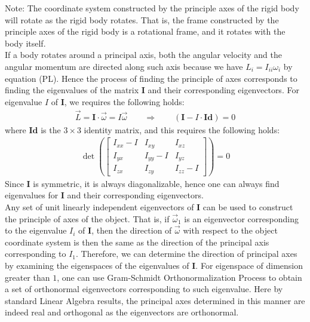 \documentclass[11pt,oneside]{book}
\theoremstyle{break}
\theoremstyle{break}
\newcommand{\note}{\color{red}Note: \color{black}}
\begin{document}
\note The coordinate system constructed by the principle axes of the rigid body will rotate as the rigid body rotates. That is, the frame constructed by the principle axes of the rigid body is a rotational frame, and it rotates with the body itself. \\


If a body rotates around a principal axis, both the angular velocity and the angular momentum are directed along such axis because we have $L_i = I_{ii}\omega_i$ by equation (PL). Hence the process of finding the principle of axes corresponds to finding the eigenvalues of the matrix $\mathbf{I}$ and their corresponding eigenvectors. For eigenvalue $I$ of $\mathbf{I}$, we requires the following holds:
\begin{align*}
\vec{L} = \mathbf{I}\cdot \vec{\omega} = I \vec{\omega} \qquad \Rightarrow \qquad (\mathbf{I} - I \cdot \mathbf{Id}) = 0
\end{align*}
where $\mathbf{Id}$ is the $3\times 3$ identity matrix, and this requires the following holds:
\begin{align*}
\det\left(\begin{bmatrix}
I_{xx}-I & I_{xy} & I_{xz} \\
I_{yx} & I_{yy}-I & I_{yz}\\
I_{zx} & I_{zy} & I_{zz}-I
\end{bmatrix}  \right) = 0
\end{align*}
Since $\mathbf{I}$ is symmetric, it is always diagonalizable, hence one can always find eigenvalues for $\mathbf{I}$ and their corresponding eigenvectors.\\

Any set of unit linearly independent eigenvectors of $\mathbf{I}$ can be used to construct the principle of axes of the object. That is, if $\vec{\omega}_1$ is an eigenvector corresponding to the  eigenvalue $I_i$ of $\mathbf{I}$, then the direction of $\vec{\omega}$ with respect to the object coordinate system is then the same as the direction of the principal axis corresponding to $I_1$. Therefore, we can determine the direction of principal axes by examining the eigenspaces of the eigenvalues of $\mathbf{I}$. For eigenspace of dimension greater than $1$, one can use Gram-Schmidt Orthonormalization Process to obtain a set of orthonormal eigenvectors corresponding to such eigenvalue. Here by standard Linear Algebra results, the principal axes determined in this manner are indeed real and orthogonal as the eigenvectors are orthonormal.\\
\end{document}

